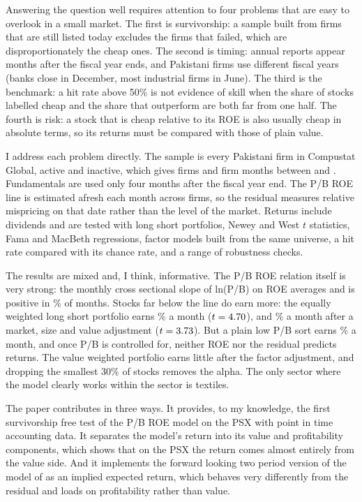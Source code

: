 \documentclass[11pt]{article}
\begin{document}
Answering the question well requires attention to four problems that are easy to overlook in a
small market. The first is survivorship: a sample built from firms that are still listed today
excludes the firms that failed, which are disproportionately the cheap ones. The second is timing:
annual reports appear months after the fiscal year ends, and Pakistani firms use different fiscal
years (banks close in December, most industrial firms in June). The third is the benchmark: a hit
rate above 50\% is not evidence of skill when the share of stocks labelled cheap and the share that
outperform are both far from one half. The fourth is risk: a stock that is cheap relative to its ROE
is also usually cheap in absolute terms, so its returns must be compared with those of plain value.

I address each problem directly. The sample is every Pakistani firm in Compustat Global, active and
inactive, which gives \NFirms{} firms and \NStockMonths{} firm months between \FirstMonth{} and
\LastMonth{}. Fundamentals are used only four months after the fiscal year end. The P/B ROE line is
estimated afresh each month across firms, so the residual measures relative mispricing on that date
rather than the level of the market. Returns include dividends and are tested with long short
portfolios, Newey and West $t$ statistics, Fama and MacBeth regressions, factor models built from
the same universe, a hit rate compared with its chance rate, and a range of robustness checks.

The results are mixed and, I think, informative. The P/B ROE relation itself is very strong: the
monthly cross sectional slope of ln(P/B) on ROE averages \SlopeMean{} and is positive in
\SlopePos\% of months. Stocks far below the line do earn more: the equally weighted long short
portfolio earns \LSew{}\% a month ($t = 4.70{}$), and \FFew{}\% a month after a market, size and
value adjustment ($t = 3.73{}$). But a plain low P/B sort earns \VALew{}\% a month, and once P/B
is controlled for, neither ROE nor the residual predicts returns. The value weighted portfolio earns
little after the factor adjustment, and dropping the smallest 30\% of stocks removes the alpha. The
only sector where the model clearly works within the sector is textiles.

The paper contributes in three ways. It provides, to my knowledge, the first survivorship free test
of the P/B ROE model on the PSX with point in time accounting data. It separates the model's return
into its value and profitability components, which shows that on the PSX the return comes almost
entirely from the value side. And it implements the forward looking two period version of the model
of \citet{wilcoxphilips2005} as an implied expected return, which behaves very differently from the
residual and loads on profitability rather than value.
\end{document}
